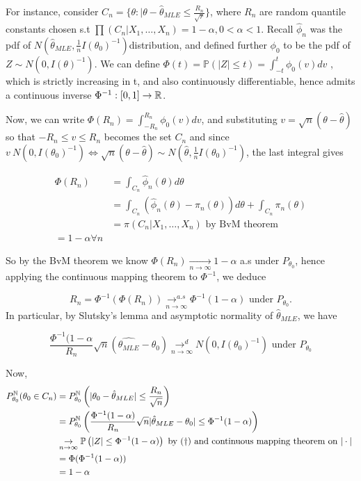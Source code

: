 \documentclass[a4paper]{article}
\begin{document}
For instance, consider $C_n = \{\theta : |\theta - \hat{\theta}_{MLE} \le \frac{R_n}{\sqrt{r} }\} $, where $R_n$ are random quantile constants chosen s.t $\prod (C_n | X_1,\ldots,X_n) = 1- \alpha, 0 < \alpha < 1$. Recall $\hat{\phi}_n$ was the pdf of $N(\hat{\theta}_{MLE}, \frac{1}{n}I(\theta_0)^{-1})$distribution, and defined further $\phi_0$ to be the pdf of $Z\sim N(0, I(\theta)^{-1})$. We can define $\Phi(t) = \mathbb{P}\left( |Z| \le t \right) = \int_{-t}^{t} \phi_0 (v) dv$ , which is strictly increasing in t, and also continuously differentiable, hence admits a continuous inverse $\Phi ^{-1} : [0,1] \to \mathbb{R}$.

Now, we can write $\Phi (R_n) = \int_{-R_n}^{R_n} \phi_0(v)dv$, and substituting $v = \sqrt{n} (\theta - \hat{\theta})$ so that $-R_n \le v \le R_n$ becomes the set $C_n$ and since $v ~ N(0, I(\theta_0)^{-1}) \iff \sqrt{n} (\theta - \hat{\theta}) \sim N(\hat{\theta}, \frac{1}{n}I(\theta_0)^{-1})$, the last integral gives

\begin{align*}
	\Phi(R_n) &= \int_{C_n} \hat{\phi}_n (\theta) d\theta \\
	&= \int_{C_n} (\hat{\phi}_n(\theta) - \pi_n(\theta)) d\theta + \int_{C_n} \pi_n(\theta) \\
	&= \pi (C_n |X_1, \ldots, X_n) \text{ by BvM theorem} \\
	= 1 - \alpha \forall n
\end{align*} 

So by the BvM theorem we know $\Phi(R_n) \underset{n\to \infty}{\to } 1 - \alpha$ a.s under $P_{\theta_0}$, hence applying the continuous mapping theorem to $\Phi ^{-1}$, we deduce

\[
	R_n = \Phi ^{-1}(\Phi(R_n)) \underset{n\to \infty}{\to ^{a.s}} \Phi ^{-1}(1-\alpha) \text{ under } P_{\theta_0}.
\] 
In particular, by Slutsky's lemma and asymptotic normality of $\hat{\theta}_{MLE}$, we have 

\[
	\frac{\Phi ^{-1} (1- \alpha}{R_n}\sqrt{n} (\hat{\theta_{MLE}} - \theta_0) \underset{n\to \infty}{\to ^{d}} N(0, I(\theta_0)^{-1}) \text{ under } P_{\theta_0}
\] 

Now,
\begin{align*}
	P_{\theta_0}^{\mathbb{N}} (\theta_0 \in C_n) &= P_{\theta_0}^{\mathbb{N}} \left( |\theta_0 - \hat{\theta}_{MLE} | \le \frac{R_n}{\sqrt{n} }\right) \\
	&= P_{\theta_0}^{\mathbb{N}} \left( \frac{\Phi ^{-1} (1-\alpha)}{R_n} \sqrt{n} |\hat{\theta}_{MLE} - \theta_0| \le \Phi ^{-1}(1-\alpha)  \right)  \\
	&\underset{n\to \infty}{\to} \mathbb{P}\left( |Z| \le \Phi ^{-1} (1- \alpha) \right) \text{ by $(\dagger)$ and continuous mapping theorem on $|\cdot |$ }\\
	&= \Phi (\Phi ^{-1} (1-\alpha)) \\
	&= 1 - \alpha
\end{align*}
\end{document}

